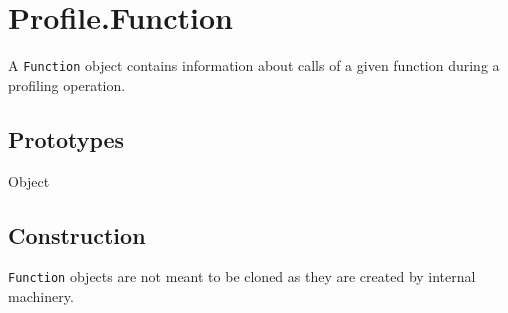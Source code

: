 
\section{Profile.Function}

A \lstinline|Function| object contains information about calls of a
given function during a profiling operation.

\subsection{Prototypes}

\begin{refObjects}
\item[Object]
\end{refObjects}

\subsection{Construction}

\lstinline|Function| objects are not meant to be cloned as they are
created by  internal machinery.

